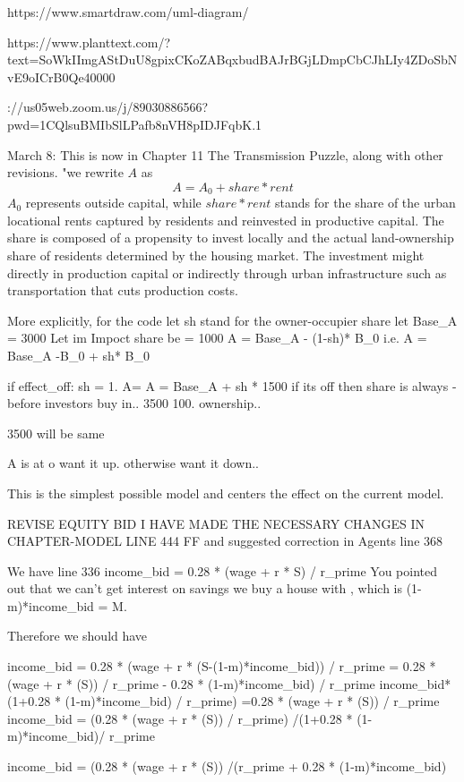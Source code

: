 
https://www.smartdraw.com/uml-diagram/

https://www.planttext.com/?text=SoWkIImgAStDuU8gpixCKoZABqxbudBAJrBGjLDmpCbCJhLIy4ZDoSbNvE9oICrB0Qe40000


\https://us05web.zoom.us/j/89030886566?pwd=1CQlsuBMIbSlLPafb8nVH8pIDJFqbK.1

March 8: This is now in Chapter 11
The Transmission Puzzle, along with other revisions.
"we rewrite $A$ as
\[ A= A_0 + share * rent\]
$A_0$ represents outside capital, while $share*rent$ stands for the share of the urban locational rents captured by residents and  reinvested in productive capital. The share is composed of a propensity to invest locally and the actual land-ownership share of residents determined by the housing market. The investment might directly in production capital or indirectly through urban infrastructure such as transportation that cuts production costs.

More explicitly, for the code let sh stand for the owner-occupier share let Base_A = 3000
Let im Impoct share  be   = 1000
A = Base_A - (1-sh)* B_0 
i.e.
A = Base_A -B_0 + sh* B_0  

if effect_off:
    sh = 1.  A=
A = Base_A + sh * 1500
if its off then share is always - before investors buy in.. 
3500 100. ownership.. 


3500 will be same 

A is at o want it up. otherwise want it down.. 


This is the simplest possible model and centers the effect on the current model.



REVISE EQUITY BID I HAVE MADE THE NECESSARY CHANGES IN CHAPTER-MODEL LINE 444 FF and suggested correction in Agents line 368

We have line 336
 income_bid = 0.28 * (wage + r * S) / r_prime
You pointed out that  we can't get interest on savings we buy a house with , which is (1-m)*income_bid = M. 

Therefore we should have

income_bid = 0.28 * (wage + r * (S-(1-m)*income_bid)) / r_prime
           = 0.28 * (wage + r * (S)) / r_prime
            - 0.28 * (1-m)*income_bid) / r_prime
income_bid*(1+0.28 * (1-m)*income_bid) / r_prime) 
                    =0.28 * (wage + r * (S)) / r_prime
 income_bid         =  (0.28 * (wage + r * (S)) / r_prime)   /(1+0.28 * (1-m)*income_bid)/ r_prime 

 income_bid = (0.28 * (wage + r * (S))  /(r_prime + 0.28 * (1-m)*income_bid)



